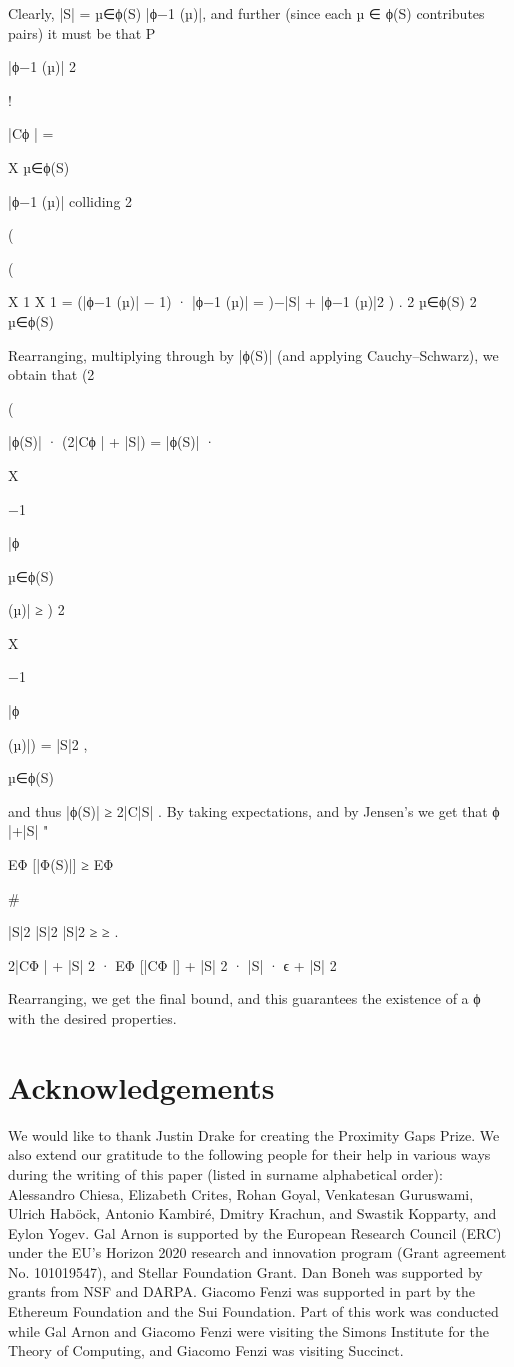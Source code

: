 \documentclass[11pt]{article}
\begin{document}
Clearly, |S| = µ∈ϕ(S) |ϕ−1 (µ)|, and further (since each µ ∈ ϕ(S) contributes
pairs) it must be that
P

|ϕ−1 (µ)|
2

!

|Cϕ | =

X
µ∈ϕ(S)

|ϕ−1 (µ)|
colliding
2

(

(

X
1 X
1
=
(|ϕ−1 (µ)| − 1) · |ϕ−1 (µ)| = )−|S| +
|ϕ−1 (µ)|2 ) .
2 µ∈ϕ(S)
2
µ∈ϕ(S)

Rearranging, multiplying through by |ϕ(S)| (and applying Cauchy–Schwarz), we obtain that
(2

(

|ϕ(S)| · (2|Cϕ | + |S|) = |ϕ(S)| ·

X

−1

|ϕ

µ∈ϕ(S)

(µ)| ≥ )
2

X

−1

|ϕ

(µ)|) = |S|2 ,

µ∈ϕ(S)


and thus |ϕ(S)| ≥ 2|C|S|
. By taking expectations, and by Jensen’s we get that
ϕ |+|S|
"

EΦ [|Φ(S)|] ≥ EΦ

\#

|S|2
|S|2
|S|2
≥
≥
.

2|CΦ | + |S|
2 · EΦ [|CΦ |] + |S|
2 · |S| · ϵ + |S|
2

Rearranging, we get the final bound, and this guarantees the existence of a ϕ with the desired
properties.


\section*{Acknowledgements}

We would like to thank Justin Drake for creating the Proximity Gaps Prize. We also extend
our gratitude to the following people for their help in various ways during the writing of this
paper (listed in surname alphabetical order): Alessandro Chiesa, Elizabeth Crites, Rohan Goyal,
Venkatesan Guruswami, Ulrich Haböck, Antonio Kambiré, Dmitry Krachun, and Swastik Kopparty,
and Eylon Yogev.
Gal Arnon is supported by the European Research Council (ERC) under the EU’s Horizon 2020
research and innovation program (Grant agreement No. 101019547), and Stellar Foundation Grant.
Dan Boneh was supported by grants from NSF and DARPA. Giacomo Fenzi was supported in part
by the Ethereum Foundation and the Sui Foundation.
Part of this work was conducted while Gal Arnon and Giacomo Fenzi were visiting the Simons
Institute for the Theory of Computing, and Giacomo Fenzi was visiting Succinct.
\end{document}
